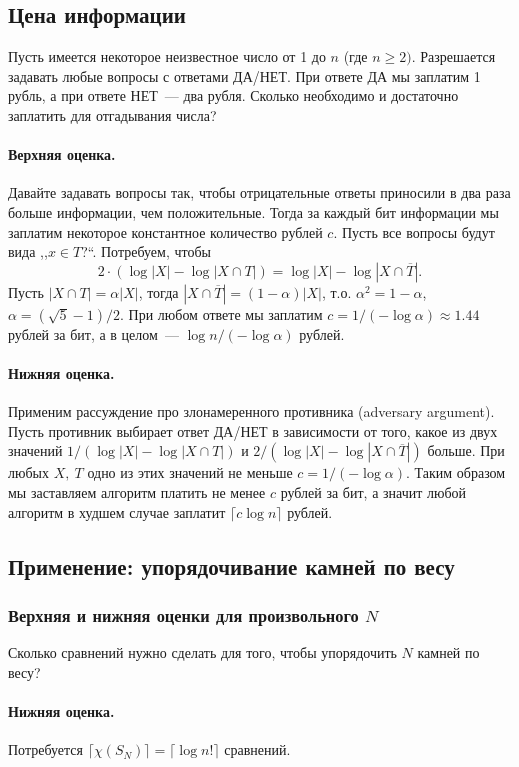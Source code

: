 \documentclass[12pt]{article}
\theoremstyle{definition}
\theoremstyle{plain}
\theoremstyle{remark}
\begin{document}
\subsection{Цена информации}
Пусть имеется некоторое неизвестное число от 1 до \(n\) (где \(n\ge2)\).
Разрешается задавать любые вопросы с ответами ДА/НЕТ. При ответе ДА мы
заплатим 1 рубль, а при ответе НЕТ~— два рубля. Сколько необходимо и достаточно заплатить для отгадывания числа?

\paragraph{Верхняя оценка.} Давайте задавать вопросы так, чтобы отрицательные ответы приносили в два раза больше информации, чем положительные. Тогда за каждый бит информации мы заплатим некоторое константное количество рублей \(c\). Пусть все вопросы будут вида ,,\(x\in T\)?``. Потребуем, чтобы
\[2\cdot(\log |X| - \log|X \cap T|) = \log |X| - \log|X\cap\overline T|.\]
Пусть \(|X \cap T| = \alpha|X|\), тогда \(|X\cap\overline T| = (1 - \alpha)|X|\),
т.о. \(\alpha^2 = 1 - \alpha\), \(\alpha=(\sqrt 5 - 1) / 2\). При любом ответе мы заплатим \(c = 1/(-\log \alpha)\approx 1.44\) рублей за бит, а в целом~— \(\log n / (-\log\alpha)\) рублей.

\paragraph{Нижняя оценка.} Применим рассуждение про злонамеренного противника (adversary argument). Пусть противник
выбирает ответ ДА/НЕТ в зависимости от того, какое из двух значений \(1/(\log |X| - \log|X \cap T|)\) и \(2/(\log |X| -
\log|X \cap \overline T|)\) больше. При любых \(X,\ T\) одно из этих значений не меньше \(c = 1/(-\log\alpha)\). Таким
образом мы заставляем алгоритм платить не менее \(c\) рублей за бит, а значит любой алгоритм в худшем случае заплатит
\(\lceil c\log n\rceil\) рублей.

\subsection{Применение: упорядочивание камней по весу}
\subsubsection{Верхняя и нижняя оценки для произвольного $N$}
Сколько сравнений нужно сделать для того, чтобы упорядочить \(N\) камней по весу?

\paragraph{Нижняя оценка.} Потребуется \(\lceil\chi(S_N)\rceil = \lceil\log n!\rceil\) сравнений.  
\end{document}
